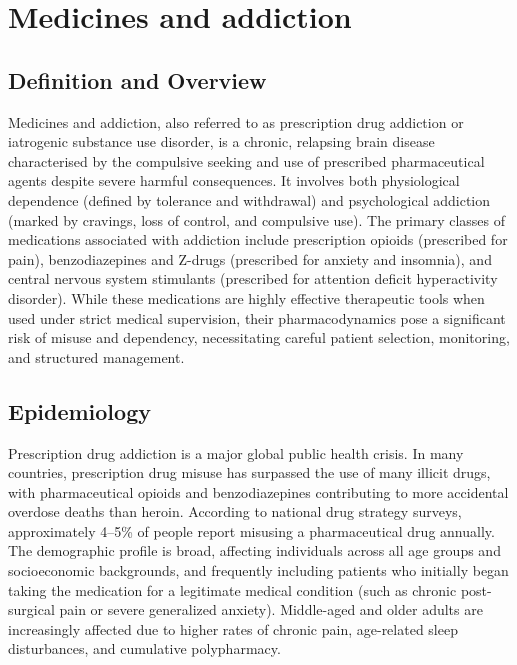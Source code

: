 \chapter{Medicines and addiction}

\section*{Definition and Overview}
Medicines and addiction, also referred to as prescription drug addiction or iatrogenic substance use disorder, is a chronic, relapsing brain disease characterised by the compulsive seeking and use of prescribed pharmaceutical agents despite severe harmful consequences. It involves both physiological dependence (defined by tolerance and withdrawal) and psychological addiction (marked by cravings, loss of control, and compulsive use). The primary classes of medications associated with addiction include prescription opioids (prescribed for pain), benzodiazepines and Z-drugs (prescribed for anxiety and insomnia), and central nervous system stimulants (prescribed for attention deficit hyperactivity disorder). While these medications are highly effective therapeutic tools when used under strict medical supervision, their pharmacodynamics pose a significant risk of misuse and dependency, necessitating careful patient selection, monitoring, and structured management.

\section*{Epidemiology}
Prescription drug addiction is a major global public health crisis. In many countries, prescription drug misuse has surpassed the use of many illicit drugs, with pharmaceutical opioids and benzodiazepines contributing to more accidental overdose deaths than heroin. According to national drug strategy surveys, approximately 4--5\% of people report misusing a pharmaceutical drug annually. The demographic profile is broad, affecting individuals across all age groups and socioeconomic backgrounds, and frequently including patients who initially began taking the medication for a legitimate medical condition (such as chronic post-surgical pain or severe generalized anxiety). Middle-aged and older adults are increasingly affected due to higher rates of chronic pain, age-related sleep disturbances, and cumulative polypharmacy.

